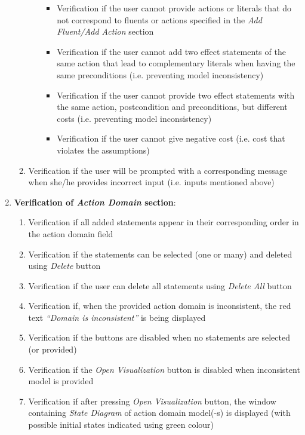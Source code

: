 \documentclass[a4paper]{article}
\begin{document}
\begin{enumerate}
\begin{enumerate}
\begin{itemize}
\begin{itemize}
                \item Verification if the user cannot provide actions or literals that do not correspond to fluents or actions specified in the \textit{Add Fluent/Add Action} section
                \item Verification if the user cannot add two effect statements of the same action that lead to complementary literals when having the same preconditions (i.e. preventing model inconsistency)
                \item Verification if the user cannot provide two effect statements with the same action, postcondition and preconditions, but different costs (i.e. preventing model inconsistency)
                \item Verification if the user cannot give negative cost (i.e. cost that violates the assumptions)
            \end{itemize}
        \end{itemize}
        \item Verification if the user will be prompted with a corresponding message when she/he provides incorrect input (i.e. inputs mentioned above)
    \end{enumerate}
    \item \textbf{Verification of \textit{Action Domain} section}:
    \begin{enumerate}
        \item Verification if all added statements appear in their corresponding order in the action domain field
        \item Verification if the statements can be selected (one or many) and deleted using \textit{Delete} button
        \item Verification if the user can delete all statements using \textit{Delete All} button
        \item Verification if, when the provided action domain is inconsistent, the red text \textit{``Domain is inconsistent''} is being displayed
        \item Verification if the buttons are disabled when no statements are selected (or provided)
        \item Verification if the \textit{Open Visualization} button is disabled when inconsistent model is provided
        \item Verification if after pressing \textit{Open Visualization} button, the window containing \textit{State Diagram} of action domain model(-s) is displayed (with possible initial states indicated using green colour)

\end{enumerate}
\end{enumerate}
\end{document}

